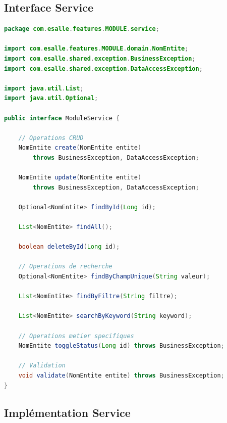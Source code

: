 \documentclass[12pt,a4paper]{article}
\begin{document}
\subsection{Interface Service}

\begin{lstlisting}[language=Java, caption=Template Interface Service]
package com.esalle.features.MODULE.service;

import com.esalle.features.MODULE.domain.NomEntite;
import com.esalle.shared.exception.BusinessException;
import com.esalle.shared.exception.DataAccessException;

import java.util.List;
import java.util.Optional;

public interface ModuleService {
    
    // Operations CRUD
    NomEntite create(NomEntite entite) 
        throws BusinessException, DataAccessException;
    
    NomEntite update(NomEntite entite) 
        throws BusinessException, DataAccessException;
    
    Optional<NomEntite> findById(Long id);
    
    List<NomEntite> findAll();
    
    boolean deleteById(Long id);
    
    // Operations de recherche
    Optional<NomEntite> findByChampUnique(String valeur);
    
    List<NomEntite> findByFiltre(String filtre);
    
    List<NomEntite> searchByKeyword(String keyword);
    
    // Operations metier specifiques
    NomEntite toggleStatus(Long id) throws BusinessException;
    
    // Validation
    void validate(NomEntite entite) throws BusinessException;
}
\end{lstlisting}

\subsection{Implémentation Service}
\end{document}
